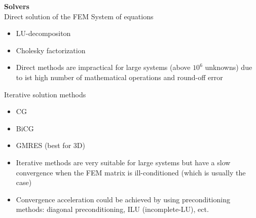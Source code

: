 \textbf{Solvers \\}
Direct solution of the FEM System of equations
\begin{itemize}
	\item LU-decompositon
	\item Cholesky factorization
	\item Direct methods are impractical for large systems (above $10^6$ unknowns) due to ist high number of mathematical operations and round-off error
\end{itemize}
Iterative solution methods
\begin{itemize}
	\item CG
	\item BiCG
	\item GMRES (best for 3D)
	\item Iterative methods are very suitable for large systems but have a slow convergence when the FEM matrix is ill-conditioned (which is usually the case)
	\item Convergence acceleration could be achieved by using preconditioning methods: diagonal preconditioning, ILU (incomplete-LU), ect. 
\end{itemize}